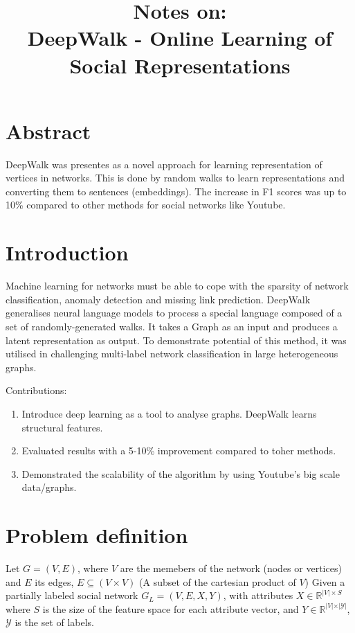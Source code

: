 \documentclass{article}
\title{\textbf{Notes on:}\\ DeepWalk - Online Learning of Social Representations}
\begin{document}
\maketitle{}

\section{Abstract}
DeepWalk was presentes as a novel approach for learning representation of
vertices in networks. This is done by random walks to learn representations and
converting them to sentences (embeddings). The increase in F1 scores was up to
10\% compared to other methods for social networks like Youtube.

\section{Introduction}
Machine learning for networks must be able to cope with the sparsity of network
classification, anomaly detection and missing link prediction. DeepWalk
generalises neural language models to process a special language composed of a
set of randomly-generated walks. It takes a Graph as an input and produces a
latent representation as output. To demonstrate potential of this method, it
was utilised in challenging multi-label network classification in large
heterogeneous graphs.

Contributions:
\begin{enumerate}
  \item Introduce deep learning as a tool to analyse graphs. DeepWalk learns structural 
    features.
  \item Evaluated results with a 5-10\% improvement compared to toher methods.
  \item Demonstrated the scalability of the algorithm by using Youtube's big scale data/graphs.
\end{enumerate}

\section{Problem definition}
Let $G = (V,E)$, where $V$ are the memebers of the network (nodes or vertices)
and $E$ its edges, $E \subseteq (V \times V)$ (A subset of the cartesian
product of $V$) Given a partially labeled social network $G_{L} = (V,E,X,Y)$,
with attributes $X \in \mathbb{R}^{\vert V \vert \times S}$ where $S$ is the
size of the feature space for each attribute vector, and $Y \in
\mathbb{R}^{\vert V \vert \times \vert \mathcal{Y} \vert} $, $\mathcal{Y}$ is
the set of labels.
\end{document}
